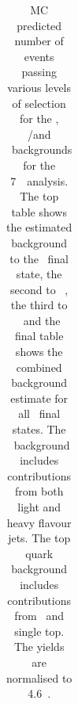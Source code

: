 \begin{table}[htbp]
\begin{tabular}{rccc}
  \end{tabular}
  \caption[MC predicted number of events passing various levels of selection for
  the \Zjets, \WZ/\WW and \topquark\ backgrounds for the 7~\tev\ analysis.]
  {MC predicted number of events passing various levels of selection for
  the \Zjets, \WZ/\WW and \topquark\ backgrounds for the 7~\tev\ analysis. The top table shows the estimated background to the \eeee\
  final state, the second to \mmmm\ , the third to \eemm\ and
  the final table shows the combined background estimate for all \llll\ final
  states. The
  \Zjets\ background includes contributions from both light and heavy flavour
  jets. The top quark background includes contributions from \ttbar\ and
  single top. The yields are normalised to 4.6~\ifb.
  }
  \label{table:mc-bg-seven}
\end{table}


